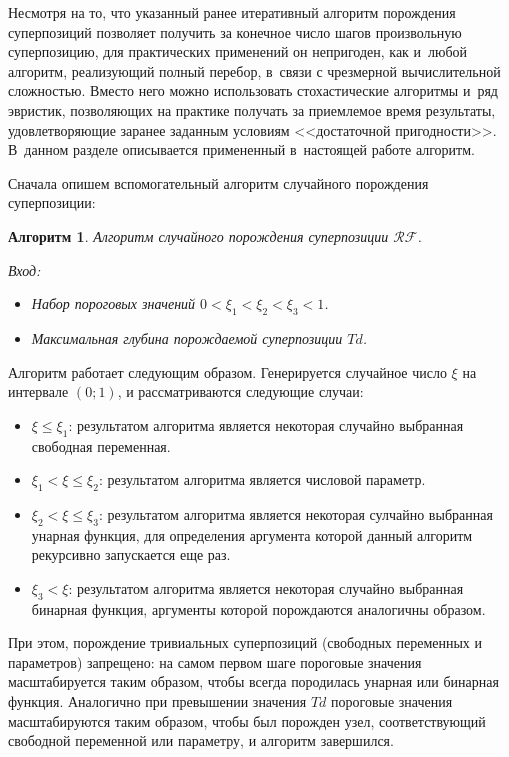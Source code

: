 \documentclass[12pt,a4paper]{amsart}
\newtheorem{algo}{Алгоритм}
\begin{document}
Несмотря на то, что указанный ранее итеративный алгоритм порождения
суперпозиций позволяет получить за конечное число шагов произвольную
суперпозицию, для практических применений он непригоден, как и~любой алгоритм,
реализующий полный перебор, в~связи с чрезмерной вычислительной сложностью.
Вместо него можно использовать стохастические алгоритмы и~ряд эвристик,
позволяющих на практике получать за приемлемое время результаты,
удовлетворяющие заранее заданным условиям <<достаточной пригодности>>.
В~данном разделе описывается примененный в~настоящей работе алгоритм.

Сначала опишем вспомогательный алгоритм случайного порождения суперпозиции:

\begin{algo}
  Алгоритм случайного порождения суперпозиции $\mathcal{RF}$.

  Вход:
  \begin{itemize}
	\item Набор пороговых значений $0 < \xi_1 < \xi_2 < \xi_3 < 1$.
	\item Максимальная глубина порождаемой суперпозиции $Td$.
  \end{itemize}
\end{algo}

Алгоритм работает следующим образом. Генерируется случайное число $\xi$ на
интервале $(0; 1)$, и рассматриваются следующие случаи:
\begin{itemize}
  \item $\xi \leq \xi_1$: результатом алгоритма является некоторая случайно
	выбранная свободная переменная.
  \item $\xi_1 < \xi \leq \xi_2$: результатом алгоритма является	числовой
	параметр.
  \item $\xi_2 < \xi \leq \xi_3$: результатом алгоритма является некоторая
	сулчайно выбранная унарная функция, для определения аргумента которой
	данный алгоритм рекурсивно запускается еще раз.
  \item $\xi_3 < \xi$: результатом алгоритма является некоторая случайно
	выбранная бинарная функция, аргументы которой порождаются аналогичны
	образом.
\end{itemize}

При этом, порождение тривиальных суперпозиций (свободных переменных и
параметров) запрещено: на самом первом шаге пороговые значения масштабируется
таким образом, чтобы всегда породилась унарная или бинарная функция.
Аналогично при превышении значения $Td$ пороговые значения масштабируются
таким образом, чтобы был порожден узел, соответствующий свободной переменной
или параметру, и алгоритм завершился.
\end{document}
